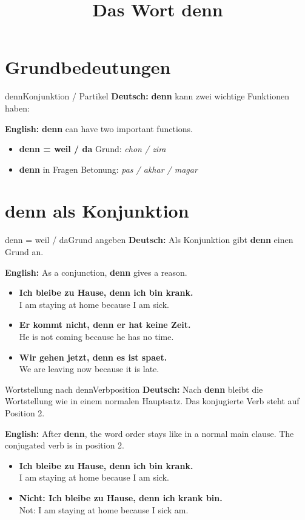 \documentclass[a4paper,11pt]{article}
\title{Das Wort \glqq denn\grqq}
\date{}
\newcommand{\GermanText}[1]{\textbf{Deutsch: }#1\par}
\newcommand{\EnglishText}[1]{{\small\color{SoftGray}\textbf{English: }#1\par}}
\newcommand{\ExampleItem}[2]{\item \textbf{#1}\\{\small\color{SoftGray}#2}}
\begin{document}
    \maketitle
    \tableofcontents
    \newpage

\section{Grundbedeutungen}

\begin{grammarentry}{denn}{Konjunktion / Partikel}
\GermanText{\textbf{denn} kann zwei wichtige Funktionen haben:}
\EnglishText{\textbf{denn} can have two important functions.}

\begin{itemize}
    \item \textbf{denn = weil / da} \quad Grund: \textit{chon / zira}
    \item \textbf{denn} in Fragen \quad Betonung: \textit{pas / akhar / magar}
\end{itemize}
\end{grammarentry}

\section{denn als Konjunktion}

\begin{grammarentry}{denn = weil / da}{Grund angeben}
\GermanText{Als Konjunktion gibt \textbf{denn} einen Grund an.}
\EnglishText{As a conjunction, \textbf{denn} gives a reason.}

\begin{exbox}
\begin{itemize}
    \ExampleItem{Ich bleibe zu Hause, denn ich bin krank.}{I am staying at home because I am sick.}
    \ExampleItem{Er kommt nicht, denn er hat keine Zeit.}{He is not coming because he has no time.}
    \ExampleItem{Wir gehen jetzt, denn es ist spaet.}{We are leaving now because it is late.}
\end{itemize}
\end{exbox}
\end{grammarentry}

\begin{grammarentry}{Wortstellung nach denn}{Verbposition}
\GermanText{Nach \textbf{denn} bleibt die Wortstellung wie in einem normalen Hauptsatz. Das konjugierte Verb steht auf Position 2.}
\EnglishText{After \textbf{denn}, the word order stays like in a normal main clause. The conjugated verb is in position 2.}

\begin{exbox}
\begin{itemize}
    \ExampleItem{Ich bleibe zu Hause, denn ich \textbf{bin} krank.}{I am staying at home because I am sick.}
    \ExampleItem{Nicht: Ich bleibe zu Hause, denn ich krank \textbf{bin}.}{Not: I am staying at home because I sick am.}
\end{itemize}
\end{exbox}
\end{grammarentry}
\end{document}
